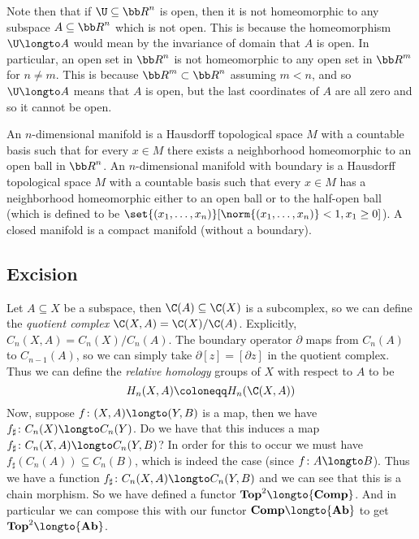 Note then that if $\U\subseteq{\bb R}^n$ is open, then it is not homeomorphic to any subspace $A\subseteq{\bb R}^n$ which is not open.
This is because the homeomorphism $\U\longto A$ would mean by the invariance of domain that $A$ is open.
In particular, an open set in ${\bb R}^n$ is not homeomorphic to any open set in ${\bb R}^m$ for $n\neq m$.
This is because ${\bb R}^m\subset{\bb R}^n$ assuming $m<n$, and so $\U\longto A$ means that $A$ is open, but the last coordinates of $A$ are all zero and so it cannot be open.

\bdefn

    An $n$-dimensional {\emphcolor manifold} is a Hausdorff topological space $M$ with a countable basis such that for every $x\in M$ there exists a neighborhood homeomorphic to an open ball in ${\bb R}^n$.
    An $n$-dimensional {\emphcolor manifold with boundary} is a Hausdorff topological space $M$ with a countable basis such that every $x\in M$ has a neighborhood homeomorphic either to an open ball or
    to the half-open ball (which is defined to be $\set{(x_1,\dots,x_n)}[\norm{(x_1,\dots,x_n)}<1,x_1\geq0]$).
    A {\emphcolor closed manifold} is a compact manifold (without a boundary).

\edefn

\subsection{Excision}

Let $A\subseteq X$ be a subspace, then $\C(A)\subseteq\C(X)$ is a subcomplex, so we can define the {\it quotient complex} $\C(X,A)=\C(X)/\C(A)$.
Explicitly, $C_n(X,A)=C_n(X)/C_n(A)$.
The boundary operator $\partial$ maps from $C_n(A)$ to $C_{n-1}(A)$, so we can simply take $\partial[z]=[\partial z]$ in the quotient complex.
Thus we can define the {\it relative homology} groups of $X$ with respect to $A$ to be
$$ H_n(X,A) \coloneqq H_n(\C(X,A)) $$
Now, suppose $f\colon(X,A)\longto(Y,B)$ is a map, then we have $f_\sharp\colon C_n(X)\longto C_n(Y)$.
Do we have that this induces a map $f_\sharp\colon C_n(X,A)\longto C_n(Y,B)$?
In order for this to occur we must have $f_\sharp(C_n(A))\subseteq C_n(B)$, which is indeed the case (since $f\colon A\longto B$).
Thus we have a function $f_\sharp\colon C_n(X,A)\longto C_n(Y,B)$ and we can see that this is a chain morphism.
So we have defined a functor ${\bf Top}^2\longto{\bf Comp}$.
And in particular we can compose this with our functor ${\bf Comp}\longto{\bf Ab}$ to get ${\bf Top}^2\longto{\bf Ab}$.

